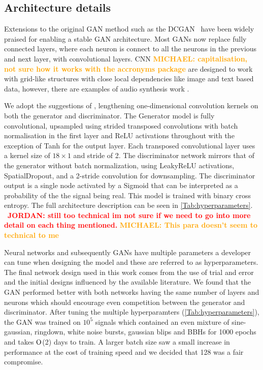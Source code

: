 \documentclass[12pt]{iopart}
\newcommand{\jordan}[1]{\textbf{\textcolor{red}{JORDAN: #1}}}
\newcommand{\chris}[1]{\textbf{\textcolor{green}{CHRIS: #1}}}
\newcommand{\michael}[1]{\textbf{\textcolor{orange}{MICHAEL: #1}}}
\begin{document}
\subsection{Architecture details}

%
Extensions to the original \ac{GAN} method such as the
\ac{DCGAN}~\cite{Radford2015} have been widely praised for
enabling a stable \ac{GAN} architecture. Most GANs now replace fully connected layers, where each neuron is connect to all the neurons in the previous and next layer, with convolutional layers. \ac{CNN} \michael{capitalisation, not sure how it works with the accronyms package} are designed to work with grid-like structures with close local dependencies like image and text based data, however, there are examples of audio synthesis work \cite{DBLP:journals/corr/abs-1809-11096}.

%
We adopt the suggestions of \cite{Radford2015,DBLP:journals/corr/abs-1809-11096}, lengthening
one-dimensional convolution kernels on both the generator and discriminator.
The Generator model is fully convolutional, upsampled using strided transposed
convolutions with batch normalisation in the first layer and ReLU activations
throughout with the exception of Tanh for the output layer. Each transposed
convolutional layer uses a kernel size of $18\times 1$ and stride of 2. The
discriminator network mirrors that of the generator without batch
normalization, using LeakyReLU activations, SpatialDropout, and a 2-stride
convolution for downsampling. The discriminator output is a single node activated by a Sigmoid that can be interpreted as
a probability of the the signal being real. This model is trained
with binary cross entropy. The full architecture description can be seen in \cref{Tab:hyperparameters}. ~\jordan{still too technical im not sure if we need to go into more detail on each thing mentioned.} \michael{This para doesn't seem to technical to me}

%
Neural networks and subsequently \acp{GAN} have multiple parameters a developer
can tune when designing the model and these are referred to as hyperparameters.
The final network design used in this work comes from the use of trial and
error and the initial designs influenced by the available literature. We found that the GAN performed better with both networks having the same number of layers and neurons which should encourage even competition between the generator and discriminator.  After
tuning the multiple hyperparamters (\cref{Tab:hyperparameters}), the GAN
was trained on $10^5$ signals which contained an even mixture of sine-gaussian, ringdown, white noise bursts, gaussian blips and BBHs for 1000 epochs and takes $\mathord{\mathrm{O}}$(2) days to train. A larger batch size saw a small increase in performance at the cost of training speed and we decided that 128 was a fair compromise. 
\end{document}
